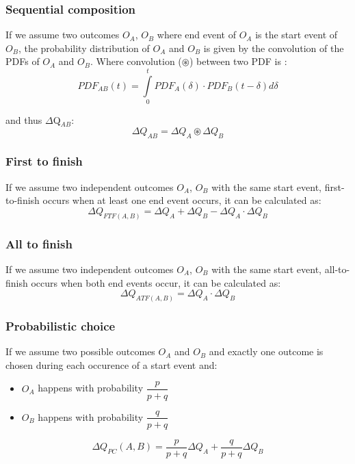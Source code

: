     \subsubsection{Sequential composition}
        If we assume two outcomes $O_A$, $O_B$ where end event of $O_A$ is the start event of $O_B$, the probability distribution of $O_A$ and $O_B$ is given by the convolution of the PDFs of $O_A$ and $O_B$.
        Where convolution ($\circledast$) between two PDF is :
        \begin{equation}
            PDF_{AB}(t) =\int\limits_0^t PDF_A(\delta) \cdot PDF_B(t-\delta)d\delta 
            \label{eq:}
        \end{equation}

            and thus $\Delta$Q$_{AB}$:
        \begin{equation}
            \Delta Q_{AB} = \Delta Q_A \circledast \Delta Q_B
            \label{eq:}
        \end{equation}
        
    \subsubsection{First to finish}
            If we assume two independent outcomes $O_A$, $O_B$ with the same start event, first-to-finish occurs when at least one end event occurs, it can be calculated as:
        \begin{equation}
            \Delta Q_{FTF(A, B)} = \Delta Q_A + \Delta Q_B - \Delta Q_A \cdot \Delta Q_B  
            \label{eq:ftf}
        \end{equation}
            
    \subsubsection{All to finish}
        If we assume two independent outcomes $O_A$, $O_B$ with the same start event, all-to-finish occurs when both end events occur, it can be calculated as:
        \begin{equation}
            \Delta Q_{ATF(A, B)} = \Delta Q_A \cdot \Delta Q_B 
            \label{eq:atf}
        \end{equation}
        \subsubsection{Probabilistic choice}
        If we assume two possible outcomes $O_A$ and $O_B$ and exactly one outcome is chosen during each occurence of a start event and:
        \begin{itemize}
            \item $O_A$ happens with probability $\dfrac{p}{p+q}$
            \item $O_B$ happens with probability $\dfrac{q}{p + q}$
        \end{itemize}
        \begin{equation}
           \Delta Q_{PC}(A, B) = \dfrac{p}{p + q}\Delta Q_A + \dfrac{q}{p + q}\Delta Q_B 
            \label{eq:pc}
        \end{equation} 

